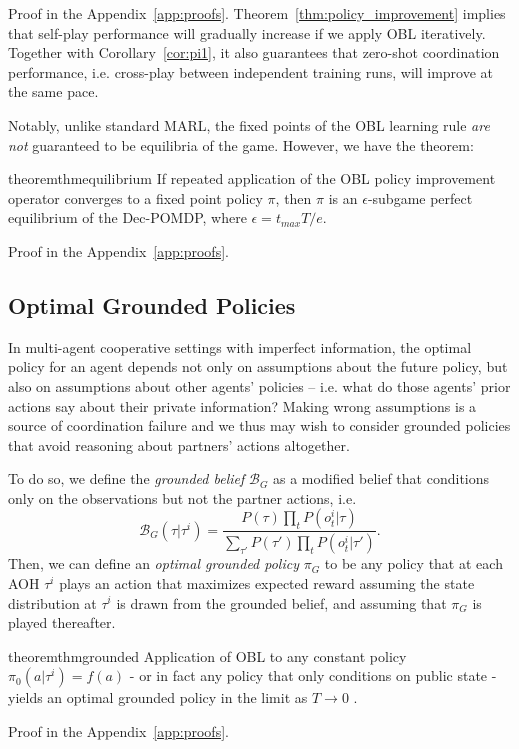 Proof in the Appendix~\ref{app:proofs}. Theorem~\ref{thm:policy_improvement} implies that self-play performance will gradually increase if we apply OBL iteratively. Together with Corollary~\ref{cor:pi1}, it also guarantees that zero-shot coordination performance, i.e. cross-play between independent training runs, will improve at the same pace.

Notably, unlike standard MARL, the fixed points of the OBL learning rule \textit{are not} guaranteed to be equilibria of the game.
However, we have the theorem:
\begin{restatable}{theorem}{thmequilibrium}
    If repeated application of the OBL policy improvement operator converges to a fixed point policy $\pi$, then $\pi$ is an $\epsilon$-subgame perfect equilibrium of the Dec-POMDP, where $\epsilon=t_{max}T/e$.
\end{restatable}
Proof in the Appendix~\ref{app:proofs}.

\subsection{Optimal Grounded Policies}
\label{sec:optimal_grounded_policy}
In multi-agent cooperative settings with imperfect information, the optimal policy for an agent depends not only on assumptions about the future policy, but also on assumptions about other agents' policies -- i.e. what do those agents' prior actions say about their private information? Making wrong assumptions is a source of coordination failure and we thus may wish to consider grounded policies that avoid reasoning about partners' actions altogether. 

To do so, we define the \textit{grounded belief} $\mathcal{B}_G$ as a modified belief that conditions only on the observations but not the partner actions, i.e. $$\mathcal{B}_G(\tau|\tau^i) = \frac{P(\tau) \prod_t{  P( o_t^i | \tau ) } }{ \sum_{\tau'} P(\tau') \prod_t{  P( o_t^i | \tau' ) } }.$$ Then, we can define an \textit{optimal grounded policy} $\pi_G$ to be any policy that at each AOH  $\tau^i$ plays an action that maximizes expected reward assuming the state distribution at $\tau^i$ is drawn from the grounded belief, and assuming that $\pi_G$ is played thereafter.
\begin{restatable}{theorem}{thmgrounded}
\label{thm:grounded}
Application of OBL to any constant policy $\pi_0(a|\tau^i)=f(a)$ - or in fact any policy that only conditions on public state - yields an optimal grounded policy in the limit as $T \to 0$ .
\end{restatable}
Proof in the Appendix~\ref{app:proofs}.

